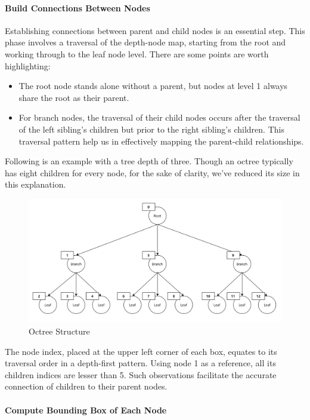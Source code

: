 \documentclass[11pt, a4paper,oneside,chapterprefix=false]{scrbook}
\begin{document}
\paragraph{Build Connections Between Nodes}

Establishing connections between parent and child nodes is an essential step. This phase involves a traversal of the depth-node map, starting from the root and working through to the leaf node level. There are some points are worth highlighting:

\begin{itemize}
	\item The root node stands alone without a parent, but nodes at level 1 always share the root as their parent.
	\item For branch nodes, the traversal of their child nodes occurs after the traversal of the left sibling's children but prior to the right sibling's children. This traversal pattern help us in effectively mapping the parent-child relationships.
\end{itemize}

Following is an example with a tree depth of three. Though an octree typically has eight children for every node, for the sake of clarity, we've reduced its size in this explanation. 

\begin{figure}[H]
    \centering
    \includegraphics*[width=1.0\textwidth]{figures/octree.png}
    \caption{Octree Structure}
    \label{fig:octree structure}
\end{figure}


The node index, placed at the upper left corner of each box, equates to its traversal order in a depth-first pattern. Using node 1 as a reference, all its children indices are lesser than 5. Such observations facilitate the accurate connection of children to their parent nodes.

\paragraph{Compute Bounding Box of Each Node}
\end{document}

